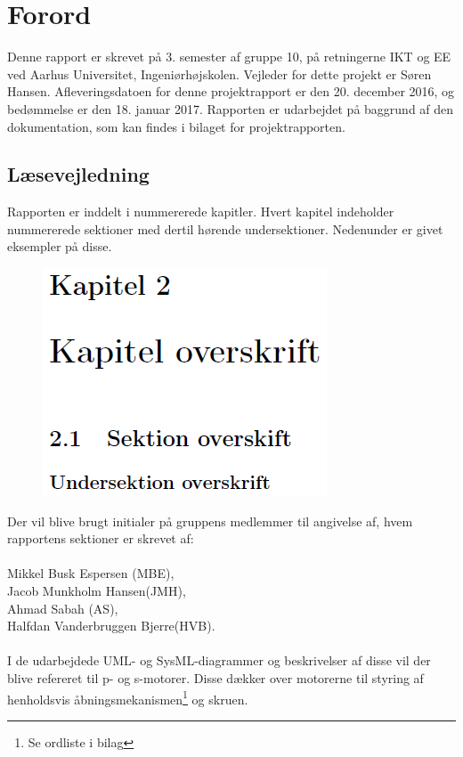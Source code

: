 \chapter{Forord}
Denne rapport er skrevet på 3. semester af gruppe 10, på retningerne IKT og EE ved Aarhus Universitet, Ingeniørhøjskolen.
Vejleder for dette projekt er Søren Hansen. Afleveringsdatoen for denne projektrapport er den 20. december 2016, og bedømmelse er den 18. januar 2017.
Rapporten er udarbejdet på baggrund af den dokumentation, som kan findes i bilaget for projektrapporten.

\section{Læsevejledning}
Rapporten er inddelt i nummererede kapitler. Hvert kapitel indeholder nummererede sektioner med dertil hørende undersektioner. Nedenunder er givet eksempler på disse. \\

\begin{figure}[H]
	\includegraphics{KapitelStoerrelse.png}
\end{figure}

\noindent
Der vil blive brugt initialer på gruppens medlemmer til angivelse af, hvem rapportens sektioner er skrevet af: \\
\\
Mikkel Busk Espersen (MBE), \\
Jacob Munkholm Hansen(JMH), \\
Ahmad Sabah (AS), \\
Halfdan Vanderbruggen Bjerre(HVB). \\
\\
I de udarbejdede UML- og SysML-diagrammer og beskrivelser af disse vil der blive refereret til p- og s-motorer. Disse dækker over motorerne til styring af 
henholdsvis åbningsmekanismen\footnote{Se ordliste i bilag} og skruen.

